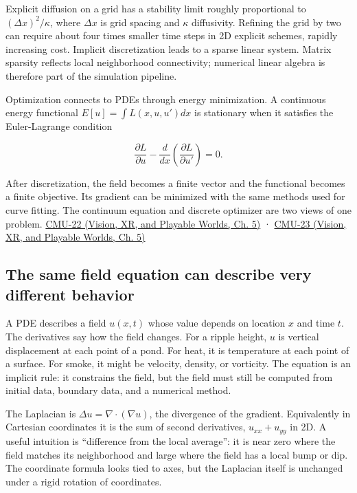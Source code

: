 Explicit diffusion on a grid has a stability limit roughly proportional to \((\Delta x)^2/\kappa\), where \(\Delta x\) is grid spacing and \(\kappa\) diffusivity. Refining the grid by two can require about four times smaller time steps in 2D explicit schemes, rapidly increasing cost. Implicit discretization leads to a sparse linear system. Matrix sparsity reflects local neighborhood connectivity; numerical linear algebra is therefore part of the simulation pipeline.

Optimization connects to PDEs through energy minimization. A continuous energy functional \(E[u]=\int L(x,u,u')dx\) is stationary when it satisfies the Euler-Lagrange condition

\[
\frac{\partial L}{\partial u}-\frac{d}{dx}\left(\frac{\partial L}{\partial u'}\right)=0.
\]

After discretization, the field becomes a finite vector and the functional becomes a finite objective. Its gradient can be minimized with the same methods used for curve fitting. The continuum equation and discrete optimizer are two views of one problem. \href{../07-Vision-XR-and-Playable-Worlds/main.pdf\#nameddest=04-visual-computing-ii-ch036-cmu-22---optimization}{CMU-22 (Vision, XR, and Playable Worlds, Ch. 5)} · \href{../07-Vision-XR-and-Playable-Worlds/main.pdf\#nameddest=04-visual-computing-ii-ch036-cmu-23---physically-based-animation-and-pdes}{CMU-23 (Vision, XR, and Playable Worlds, Ch. 5)}

\subsection{The same field equation can describe very different behavior}\label{04-visual-computing-ii-ch030-the-same-field-equation-can-describe-very-different-behavior}

\hypertarget{04-visual-computing-ii-ch030-the-same-field-equation-can-describe-very-different-behavior}{}

A PDE describes a field \(u(x,t)\) whose value depends on location \(x\) and time \(t\). The derivatives say how the field changes. For a ripple height, \(u\) is vertical displacement at each point of a pond. For heat, it is temperature at each point of a surface. For smoke, it might be velocity, density, or vorticity. The equation is an implicit rule: it constrains the field, but the field must still be computed from initial data, boundary data, and a numerical method.

The Laplacian is \(\Delta u=\nabla\cdot(\nabla u)\), the divergence of the gradient. Equivalently in Cartesian coordinates it is the sum of second derivatives, \(u_{xx}+u_{yy}\) in 2D. A useful intuition is ``difference from the local average'': it is near zero where the field matches its neighborhood and large where the field has a local bump or dip. The coordinate formula looks tied to axes, but the Laplacian itself is unchanged under a rigid rotation of coordinates.

